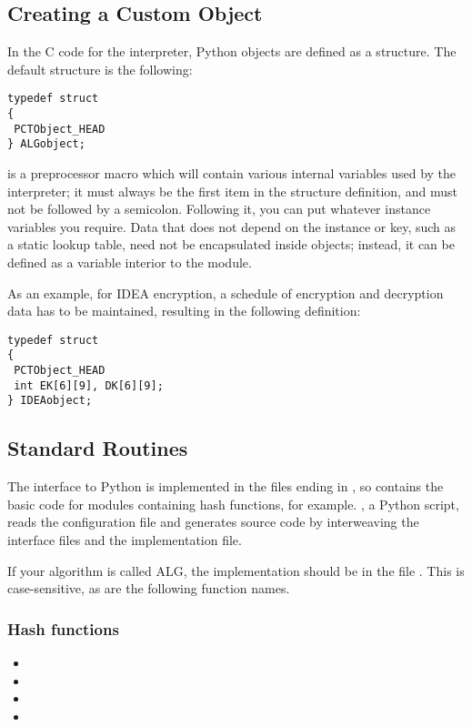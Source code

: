 \documentclass{howto}
\begin{document}
\subsection{Creating a Custom Object}
In the C code for the interpreter, Python objects are defined as a
structure.  The default structure is the following:
\begin{verbatim}
typedef struct 
{
 PCTObject_HEAD
} ALGobject;
\end{verbatim}


 is a preprocessor macro which will contain various
internal variables used by the interpreter; it must always be the
first item in the structure definition, and must not be followed by a
semicolon.  Following it, you can put whatever instance variables you
require.  Data that does not depend on the instance or key, such as a
static lookup table, need not be encapsulated inside objects; instead,
it can be defined as a variable interior to the module.

As an example, for IDEA encryption, a schedule of encryption and
decryption data has to be maintained, resulting in the following
definition:
\begin{verbatim}
typedef struct 
{
 PCTObject_HEAD
 int EK[6][9], DK[6][9];
} IDEAobject;
\end{verbatim}


\subsection{Standard Routines}

The interface to Python is implemented in the files ending in
, so  contains the basic code for modules
containing hash functions, for example.  , a Python
script, reads the configuration file and generates source code by
interweaving the interface files and the implementation file.

If your algorithm is called ALG, the implementation should be in the
file . This is case-sensitive, as are the following function
names.  

\subsubsection{Hash functions}

\begin{itemize}
\item {}
\item {}
\item {}
\item {}
\end{itemize}
\end{document}

